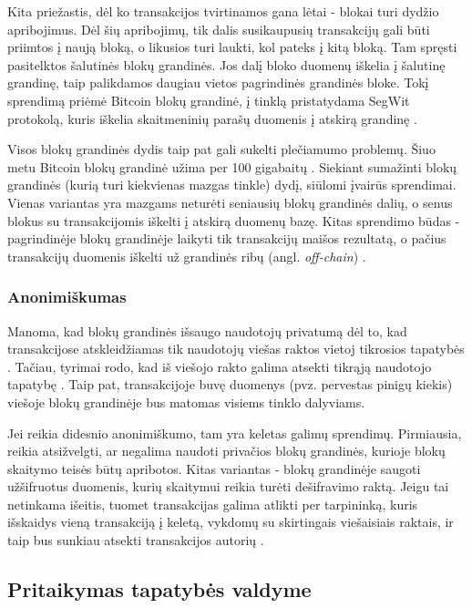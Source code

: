 Kita priežastis, dėl ko transakcijos tvirtinamos gana lėtai - blokai turi dydžio apribojimus. Dėl šių apribojimų, tik dalis susikaupusių transakcijų gali būti priimtos
į naują bloką, o likusios turi laukti, kol pateks į kitą bloką. Tam spręsti pasitelktos šalutinės blokų grandinės. Jos dalį bloko duomenų iškelia į šalutinę grandinę,
taip palikdamos daugiau vietos pagrindinės grandinės bloke. Tokį sprendimą priėmė Bitcoin blokų grandinė, į tinklą pristatydama SegWit protokolą, kuris iškelia skaitmeninių
parašų duomenis į atskirą grandinę \cite{Segwit}.

Visos blokų grandinės dydis taip pat gali sukelti plečiamumo problemų. Šiuo metu Bitcoin blokų grandinė užima per 100 gigabaitų \cite{Zheng2017}. Siekiant sumažinti blokų grandinės
(kurią turi kiekvienas mazgas tinkle) dydį,
siūlomi įvairūs sprendimai. Vienas variantas yra mazgams neturėti seniausių blokų grandinės dalių, o senus blokus su transakcijomis iškelti į atskirą duomenų bazę.
Kitas sprendimo būdas - pagrindinėje blokų grandinėje laikyti tik transakcijų maišos rezultatą, o pačius transakcijų duomenis
iškelti už grandinės ribų (angl. \textit{off-chain}) \cite{Lo2017}.

\subsubsection{Anonimiškumas}

Manoma, kad blokų grandinės išsaugo naudotojų privatumą dėl to, kad transakcijose atskleidžiamas tik naudotojų
viešas raktos vietoj tikrosios tapatybės \cite{Zheng2017}. Tačiau, tyrimai rodo, kad iš viešojo rakto galima
atsekti tikrąją naudotojo tapatybę \cite{Barcelo2007}. Taip pat, transakcijoje buvę duomenys (pvz. pervestas pinigų kiekis)
viešoje blokų grandinėje bus matomas visiems tinklo dalyviams.

Jei reikia didesnio anonimiškumo, tam yra
keletas galimų sprendimų. Pirmiausia, reikia atsižvelgti, ar negalima naudoti privačios blokų grandinės, kurioje
blokų skaitymo teisės būtų apribotos. Kitas variantas - blokų grandinėje saugoti užšifruotus duomenis, kurių skaitymui
reikia turėti dešifravimo raktą. Jeigu tai netinkama išeitis, tuomet transakcijas galima atlikti per tarpininką, kuris išskaidys vieną transakciją
į keletą, vykdomų su skirtingais viešaisiais raktais, ir taip bus sunkiau atsekti transakcijos autorių \cite{Zheng2017}.

\subsection{Pritaikymas tapatybės valdyme}

